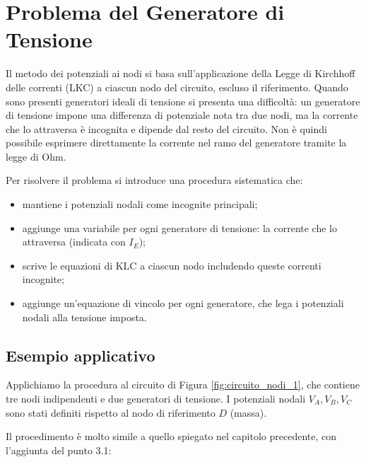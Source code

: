 \section{Problema del Generatore di Tensione}

Il metodo dei potenziali ai nodi si basa sull’applicazione della Legge di Kirchhoff delle correnti (LKC) a ciascun nodo del circuito, escluso il riferimento. Quando sono presenti generatori ideali di tensione si presenta una difficoltà: un generatore di tensione impone una differenza di potenziale nota tra due nodi, ma la corrente che lo attraversa è incognita e dipende dal resto del circuito. Non è quindi possibile esprimere direttamente la corrente nel ramo del generatore tramite la legge di Ohm.

Per risolvere il problema si introduce una procedura sistematica che:
\begin{itemize}
    \item mantiene i potenziali nodali come incognite principali;
    \item aggiunge una variabile per ogni generatore di tensione: la corrente che lo attraversa (indicata con \(I_E\));
    \item scrive le equazioni di KLC a ciascun nodo includendo queste correnti incognite;
    \item aggiunge un’equazione di vincolo per ogni generatore, che lega i potenziali nodali alla tensione imposta.
\end{itemize}

\subsection*{Esempio applicativo}

Applichiamo la procedura al circuito di Figura \ref{fig:circuito_nodi_1}, che contiene tre nodi indipendenti e due generatori di tensione. I potenziali nodali \(V_A, V_B, V_C\) sono stati definiti rispetto al nodo di riferimento \(D\) (massa).


Il procedimento è molto simile a quello spiegato nel capitolo precedente, con l’aggiunta del punto 3.1:

